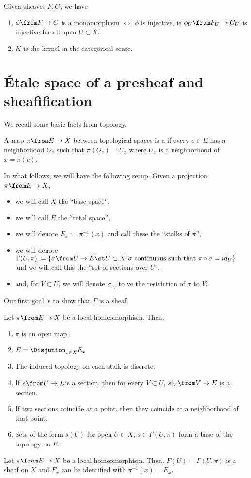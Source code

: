 \documentclass[11pt,leqno,oneside]{amsbook}
\renewcommand{\F}{F} %
\newcommand{\G}{G}
\numberwithin{thm}{section}
\begin{document}
\begin{prop}
    Given sheaves \(\F,\G\), we have 
    \begin{enumerate}
    \item \(\phi \from \F \to \G\) is a monomorphism \(\iff\) \(\phi\)
      is injective, ie \(\phi_U \from \F_U \to \G_U\) is injective for
      all open \(U \subset X\).
    \item \(K\) is the kernel in the categorical sense.
    \end{enumerate}
\end{prop}
\section{\'{E}tale space of a presheaf and sheafification}
We recall some basic facts from topology.
\begin{defn}
  A map \(\pi \from E \to X\) between topological spaces is a
   if every \(e \in E\) has a neighborhood
  \(O_e\) such that \(\pi(O_e) = U_x\) where \(U_x\) is a
  neighborhood of \(x = \pi(e)\). 
\end{defn}
In what follows, we will have the following setup. Given a projection
\(\pi \from E \to X\), 
\begin{itemize}
\item we will call \(X\) the ``base space'',
\item we will call \(E\) the ``total space'',
\item we will denote \(E_x := \pi^{-1}(x)\) and call these the ``stalks
  of \(\pi\)'',
\item we will denote \(\Gamma(U,\pi) := \{\sigma \from U \to E \st
  U \subset X, \sigma \text{ continuous such that }\pi \circ \sigma =
  id_U\}\) and we will call this the ``set of sections over \(U\)'',
\item and, for \(V \subset U\), we will denote \(\sigma|_V\) to ve the
  restriction of \(\sigma\) to \(V\).
\end{itemize}
Our first goal is to show that \(\Gamma\) is a sheaf.
\begin{prop}
  Let \(\pi \from E \to X\) be a local homeomorphism. Then,
  \begin{enumerate}
  \item \(\pi\) is an open map.
  \item \(E = \Disjunion_{x \in X} E_x\)
  \item The induced topology on each stalk is discrete.
  \item If \(s \from U \to E\)is a section, then for every \(V \subset
    U\), \(s|_V \from V \to E\) is a section.
  \item If two sections coincide at a point, then they coincide at a
    neighborhood of that point.
  \item Sets of the form \(s(U)\) for open \(U \subset X\), \(s \in
    \Gamma(U,\pi)\) form a base of the topology on \(E\).
  \end{enumerate}
\end{prop}
\begin{thm}
  Let \(\pi \from E \to X\) be a local homeomorphism. Then, \(\F(U) =
  \Gamma(U,\pi)\) is a sheaf on \(X\) and \(\F_x\) can be identified
  with \(\pi^{-1}(x) = E_x\).
\end{thm}
\begin{bibdiv}
  \begin{biblist}
  \end{biblist}
\end{bibdiv}
\end{document}
